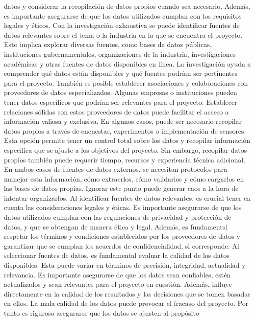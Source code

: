 \documentclass[
  letterpaper,
  DIV=11,
  numbers=noendperiod]{scrreprt}
\begin{document}
datos y considerar la recopilación de datos propios cuando sea
necesario. Además, es importante asegurarse de que los datos utilizados
cumplan con los requisitos legales y éticos. Con la investigación
exhaustiva se puede identificar fuentes de datos relevantes sobre el
tema o la industria en la que se encuentra el proyecto. Esto implica
explorar diversas fuentes, como bases de datos públicas, instituciones
gubernamentales, organizaciones de la industria, investigaciones
académicas y otras fuentes de datos disponibles en línea. La
investigación ayuda a comprender qué datos están disponibles y qué
fuentes podrían ser pertinentes para el proyecto. También es posible
establecer asociaciones y colaboraciones con proveedores de datos
especializados. Algunas empresas o instituciones pueden tener datos
específicos que podrían ser relevantes para el proyecto. Establecer
relaciones sólidas con estos proveedores de datos puede facilitar el
acceso a información valiosa y exclusiva. En algunos casos, puede ser
necesario recopilar datos propios a través de encuestas, experimentos o
implementación de sensores. Esta opción permite tener un control total
sobre los datos y recopilar información específica que se ajuste a los
objetivos del proyecto. Sin embargo, recopilar datos propios también
puede requerir tiempo, recursos y experiencia técnica adicional. En
ambos casos de fuentes de datos externos, se necesitan protocolos para
manejar esta información, cómo extraerlos, cómo validarlos y cómo
cargarlos en las bases de datos propias. Ignorar este punto puede
generar caos a la hora de intentar organizarlos. Al identificar fuentes
de datos relevantes, es crucial tener en cuenta las consideraciones
legales y éticas. Es importante asegurarse de que los datos utilizados
cumplan con las regulaciones de privacidad y protección de datos, y que
se obtengan de manera ética y legal. Además, es fundamental respetar los
términos y condiciones establecidos por los proveedores de datos y
garantizar que se cumplan los acuerdos de confidencialidad, si
corresponde. Al seleccionar fuentes de datos, es fundamental evaluar la
calidad de los datos disponibles. Esta puede variar en términos de
precisión, integridad, actualidad y relevancia. Es importante asegurarse
de que los datos sean confiables, estén actualizados y sean relevantes
para el proyecto en cuestión. Además, influye directamente en la calidad
de los resultados y las decisiones que se tomen basadas en ellos. La
mala calidad de los datos puede provocar el fracaso del proyecto. Por
tanto es riguroso asegurarse que los datos se ajusten al propósito
\end{document}
